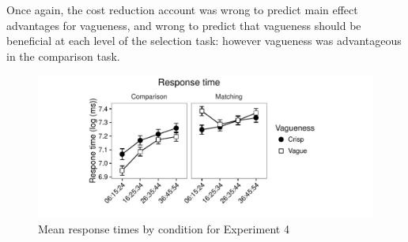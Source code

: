 Once again, the cost reduction account was wrong to predict main effect advantages for vagueness, and wrong to predict that vagueness should be beneficial at each level of the selection task: however vagueness was advantageous in the comparison task.

\begin{figure}[htbp]
\centering
\includegraphics[width=\textwidth]{figures/e4-rtplot-1.pdf}
\caption{Mean response times by condition for Experiment 4}
\label{resultse4}
\end{figure}

